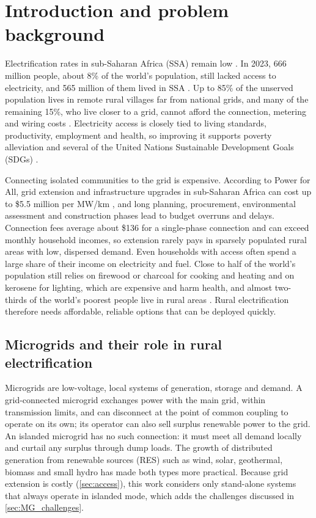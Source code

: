 \documentclass[final,3p,times]{elsarticle}
\begin{document}
\section{Introduction and problem background \label{sec:access}}

Electrification rates in sub-Saharan Africa (SSA) remain low \cite{SSA_decent}. In 2023, 666 million people, about 8\% of the world's population, still lacked access to electricity, and 565 million of them lived in SSA \cite{sdg7_2025}. Up to 85\% of the unserved population lives in remote rural villages far from national grids, and many of the remaining 15\%, who live closer to a grid, cannot afford the connection, metering and wiring costs \cite{quak_CBA}. Electricity access is closely tied to living standards, productivity, employment and health, so improving it supports poverty alleviation and several of the United Nations Sustainable Development Goals (SDGs) \cite{SSA_decent}.

Connecting isolated communities to the grid is expensive. According to Power for All, grid extension and infrastructure upgrades in sub-Saharan Africa can cost up to \$5.5 million per MW/km \cite{grid_gtm}, and long planning, procurement, environmental assessment and construction phases lead to budget overruns and delays. Connection fees average about \$136 for a single-phase connection and can exceed monthly household incomes, so extension rarely pays in sparsely populated rural areas with low, dispersed demand. Even households with access often spend a large share of their income on electricity and fuel. Close to half of the world's population still relies on firewood or charcoal for cooking and heating and on kerosene for lighting, which are expensive and harm health, and almost two-thirds of the world's poorest people live in rural areas \cite{kammen}. Rural electrification therefore needs affordable, reliable options that can be deployed quickly.

\subsection{Microgrids and their role in rural electrification}

Microgrids are low-voltage, local systems of generation, storage and demand. A grid-connected microgrid exchanges power with the main grid, within transmission limits, and can disconnect at the point of common coupling to operate on its own; its operator can also sell surplus renewable power to the grid. An islanded microgrid has no such connection: it must meet all demand locally and curtail any surplus through dump loads. The growth of distributed generation from renewable sources (RES) such as wind, solar, geothermal, biomass and small hydro has made both types more practical. Because grid extension is costly (\cref{sec:access}), this work considers only stand-alone systems that always operate in islanded mode, which adds the challenges discussed in \cref{sec:MG_challenges}.
\end{document}
